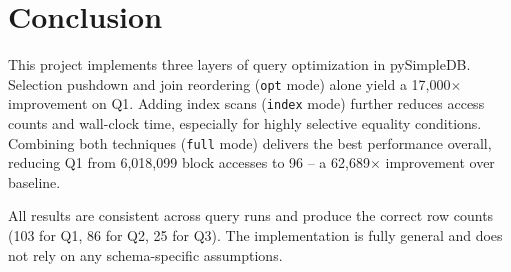 \documentclass[12pt,a4paper]{article}
\begin{document}
\section{Conclusion}

This project implements three layers of query optimization in pySimpleDB. Selection pushdown and join reordering (\texttt{opt} mode) alone yield a 17,000$\times$ improvement on Q1. Adding index scans (\texttt{index} mode) further reduces access counts and wall-clock time, especially for highly selective equality conditions. Combining both techniques (\texttt{full} mode) delivers the best performance overall, reducing Q1 from 6,018,099 block accesses to 96 -- a 62,689$\times$ improvement over baseline.

All results are consistent across query runs and produce the correct row counts (103 for Q1, 86 for Q2, 25 for Q3). The implementation is fully general and does not rely on any schema-specific assumptions.
\end{document}
